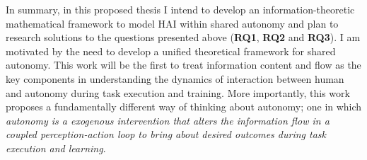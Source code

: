 \documentclass[12pt]{article}
\newcommand{\POINTS}[1]{{\textbf{\color{red}{#1}}}}
\begin{document}
In summary, in this proposed thesis I intend to develop an information-theoretic mathematical framework to model HAI within shared autonomy and plan to research solutions to the questions presented above (\textbf{RQ1}, \textbf{RQ2} and \textbf{RQ3}). I am motivated by the need to develop a unified theoretical framework for shared autonomy. This work will be the first to treat information content and flow as the key components in understanding the dynamics of interaction between human and autonomy during task execution and training. More importantly, this work proposes a fundamentally different way of thinking about autonomy; one in which \textit{autonomy is a exogenous intervention that alters the information flow in a coupled perception-action loop to bring about desired outcomes during task execution and learning}.



%


\end{document}
